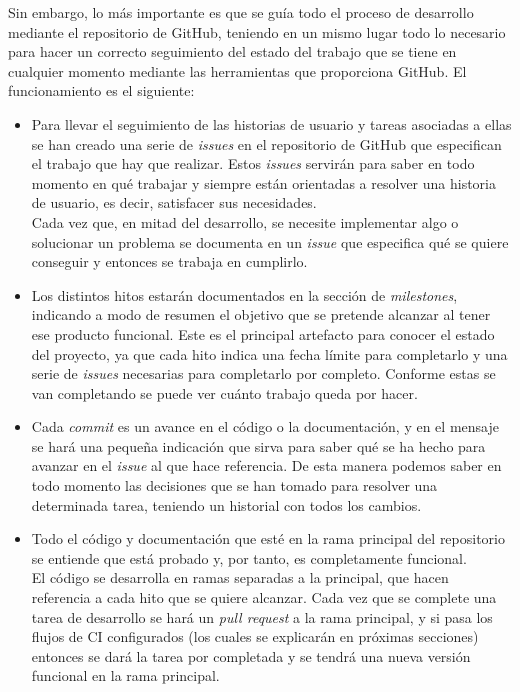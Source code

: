Sin embargo, lo más importante es que se guía todo el proceso de desarrollo mediante el repositorio de GitHub, teniendo en un mismo lugar todo lo necesario para hacer un correcto seguimiento del estado del trabajo que se tiene en cualquier momento mediante las herramientas que proporciona GitHub. El funcionamiento es el siguiente:
\begin{itemize}
    \item Para llevar el seguimiento de las historias de usuario y tareas asociadas a ellas se han creado una serie de \textit{issues} en el repositorio de GitHub que especifican el trabajo que hay que realizar. Estos \textit{issues} servirán para saber en todo momento en qué trabajar y siempre están orientadas a resolver una historia de usuario, es decir, satisfacer sus necesidades.\\
    Cada vez que, en mitad del desarrollo, se necesite implementar algo o solucionar un problema se documenta en un \textit{issue} que especifica qué se quiere conseguir y entonces se trabaja en cumplirlo.
    \item Los distintos hitos estarán documentados en la sección de \textit{milestones}, indicando a modo de resumen el objetivo que se pretende alcanzar al tener ese producto funcional. Este es el principal artefacto para conocer el estado del proyecto, ya que cada hito indica una fecha límite para completarlo y una serie de \textit{issues} necesarias para completarlo por completo. Conforme estas se van completando se puede ver cuánto trabajo queda por hacer.
    \item Cada \textit{commit} es un avance en el código o la documentación, y en el mensaje se hará una pequeña indicación que sirva para saber qué se ha hecho para avanzar en el \textit{issue} al que hace referencia. De esta manera podemos saber en todo momento las decisiones que se han tomado para resolver una determinada tarea, teniendo un historial con todos los cambios.
    \item Todo el código y documentación que esté en la rama principal del repositorio se entiende que está probado y, por tanto, es completamente funcional. \\
    El código se desarrolla en ramas separadas a la principal, que hacen referencia a cada hito que se quiere alcanzar. Cada vez que se complete una tarea de desarrollo se hará un \textit{pull request} a la rama principal, y si pasa los flujos de CI configurados (los cuales se explicarán en próximas secciones) entonces se dará la tarea por completada y se tendrá una nueva versión funcional en la rama principal. 
\end{itemize}

